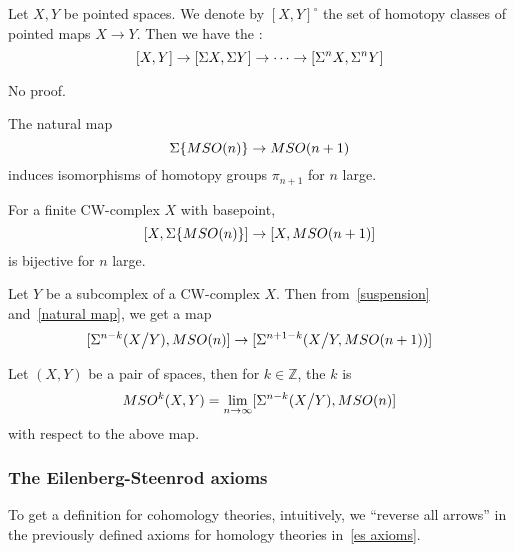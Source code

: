 \documentclass[a4paper,11pt]{article}
\begin{document}
\begin{theorem}\label{suspension}
    Let \(X, Y\) be pointed spaces. We denote by \({[X,Y]}^\circ\) the set of homotopy classes of pointed maps \(X\to Y\). Then we have the :
    \[[X,Y]\to[\Sigma{X},\Sigma{Y}]\to\dots\to[\Sigma^n{X},\Sigma^n{Y}]\] 
\end{theorem}


\begin{theorem}\label{freudenthal}
\end{theorem}

No proof.

\begin{lemma}\label{natural map}\cite{thom}
    The natural map
    \[\Sigma\{MSO(n)\}\to MSO(n+1)\]
    induces isomorphisms of homotopy groups \(\pi_{n+1}\) for \(n\) large.
\end{lemma}

\begin{corollary}
    For a finite CW-complex \(X\) with basepoint, \[[X,\Sigma\{MSO(n)\}]\to[X,MSO(n+1)]\] is bijective for \(n\) large.
\end{corollary}

\begin{lemma}
    Let \(Y\) be a subcomplex of a CW-complex \(X\). Then from\ \ref{suspension} and\ \ref{natural map}, we get a map
    \[[\Sigma^{n-k}(X\big/ Y),MSO(n)]\to[\Sigma^{n+1-k}(X\big/Y, MSO(n+1))]\]
\end{lemma}

\begin{definition}
    Let \((X,Y)\) be a pair of spaces, then for \(k\in\mathbb{Z}\), the \(k\) is
    \[MSO^k(X,Y)=\lim_{n\to\infty}[\Sigma^{n-k}(X\big/Y),MSO(n)]\]
    with respect to the above map.
\end{definition}

\subsubsection{The Eilenberg-Steenrod axioms}
To get a definition for cohomology theories, intuitively, we \enquote{reverse all arrows} in the previously defined axioms for homology theories in\ \ref{es axioms}.
\end{document}
